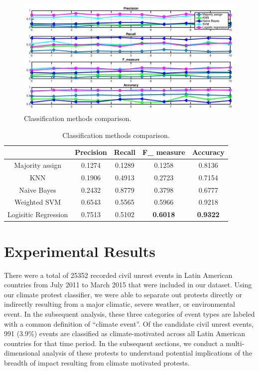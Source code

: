\begin{figure}[ht]
\centerline
{\includegraphics[width = 5in]{figures/resultsComp1.png}}
\caption{Classification methods comparison.}
\label{resultsComp}
\end{figure}

\begin{table}[!ht]
\small
\caption{Classification methods comparison.}
\vspace{0.5em}
\centering
\begin{tabular}{|c | c | c | c | c |}
\hline
 & \textbf{Precision} & \textbf{Recall} & \textbf{F\_ measure} & \textbf{Accuracy}  \\ [1ex]
\hline
Majority assign   &  0.1274  &  0.1289 &  0.1258 &  0.8136  \\[1ex]
\hline
KNN &  0.1906  & 0.4913 &  0.2723 &  0.7154  \\[1ex]
\hline
Naive Bayes &  0.2432 & 0.8779 &  0.3798 &  0.6777  \\[1ex]
\hline
Weighted SVM &  0.6543 &  0.5565 & 0.5966 &  0.9218  \\[1ex]
\hline
Logisitic Regression & 0.7513 &  0.5102 &  \textbf{0.6018}&  \textbf{0.9322}  \\[1ex]
\hline
\end{tabular}
\label{table:comparision}
\end{table}




\section{Experimental Results}

There were a total of 25352 recorded civil unrest events in Latin American countries from July 2011 to March 2015 that were included in our dataset.
Using our climate protest classifier, we were able to separate out protests directly or indirectly resulting from a major climatic, severe weather, or environmental event.
In the subsequent analysis, these three categories of event types are labeled with a common definition of ``climate event''.
Of the candidate civil unrest events, 991 (3.9\%) events are classified as climate-motivated across all Latin American countries for that time period.
In the subsequent sections, we conduct a multi-dimensional analysis of these protests to understand potential implications of the breadth of impact resulting from climate motivated protests.


